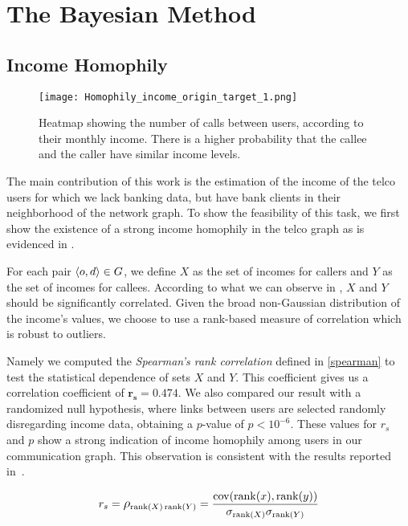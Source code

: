 \section{The Bayesian Method}
\label{inference_methodology}

\subsection{Income Homophily}

\begin{figure}[ht]
	\texttt{[image: Homophily\_income\_origin\_target\_1.png]}
	\caption{Heatmap showing the number of calls between users, according to their monthly income. There is a higher probability that the callee and the caller have similar income levels.}
\label{homophily_heatmap}
\end{figure}

The main contribution of this work is the estimation of the income of the telco users for which we lack banking data, but have bank clients in their neighborhood of the network graph. To show the feasibility of this task, we first show the existence of a strong income homophily in the telco graph as is evidenced in .

For each pair $\left< o, d \right> \in \mathlarger{G}$, we define $X$ as the set of incomes for callers and $Y$ as the set of incomes for callees. According to what we can observe in , $X$ and $Y$ should be significantly correlated. Given the broad non-Gaussian distribution of the income's values, we choose to use a rank-based measure of correlation which is robust to outliers.

Namely we computed the \textit{Spearman's rank correlation} defined in \cref{spearman} to test the statistical dependence of sets $X$ and $Y$. This coefficient gives us a correlation coefficient of $\mathbf{r_s = 0.474}$. We also compared our result with a randomized null hypothesis, where links between users are selected randomly disregarding income data, obtaining a $p$-value of $p < 10^{-6}$. These values for $r_s$ and $p$ show a strong indication of income homophily among users in our communication graph. This observation is consistent with the results reported in~\cite{leo2015socioeconomic}.

\begin{equation}
r_s = \mathlarger{\rho}_{\operatorname{rank}(X) \operatorname{rank}(Y)} = \frac{\operatorname{cov}(\operatorname{rank}(x), \operatorname{rank}(y))}{\sigma_{\operatorname{rank}(X)} \sigma_{\operatorname{rank}(Y)}}
\label{spearman}
\end{equation}

